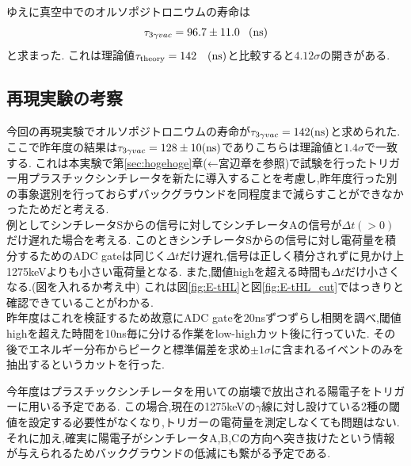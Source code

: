 ゆえに真空中でのオルソポジトロニウムの寿命は
\begin{equation}
	\tau_{3\gamma vac}=96.7 \pm 11.0 \hspace{8pt}(\rm ns)
\end{equation}
と求まった.
これは理論値$\tau_{\rm theory}=142 \hspace{10pt}(\rm ns)$と比較すると$4.12\sigma$の開きがある.

\subsection{再現実験の考察}
今回の再現実験でオルソポジトロニウムの寿命が$\tau_{3\gamma vac}=142(\rm ns)$と求められた.
ここで昨年度の結果は$\tau_{3\gamma vac}=128 \pm 10(\rm ns)$でありこちらは理論値と$1.4\sigma$で一致する.
これは本実験で第\ref{sec:hogehoge}章(←宮辺章を参照)で試験を行ったトリガー用プラスチックシンチレータを新たに導入することを考慮し,昨年度行った別の事象選別を行っておらずバックグラウンドを同程度まで減らすことができなかったためだと考える. \\

例としてシンチレータSからの信号に対してシンチレータAの信号が$\Delta t(>0)$だけ遅れた場合を考える.
このときシンチレータSからの信号に対し電荷量を積分するためのADC gateは同じく$\Delta t$だけ遅れ,信号は正しく積分されずに見かけ上1275keVよりも小さい電荷量となる.
また,閾値highを超える時間も$\Delta t$だけ小さくなる.(図を入れるか考え中)
これは図\ref{fig:E-tHL}と図\ref{fig:E-tHL_cut}ではっきりと確認できていることがわかる.\\
昨年度はこれを検証するため故意にADC gateを20nsずつずらし相関を調べ,閾値highを超えた時間を10ns毎に分ける作業をlow-highカット後に行っていた.
その後でエネルギー分布からピークと標準偏差を求め$\pm 1\sigma$に含まれるイベントのみを抽出するというカットを行った.

今年度はプラスチックシンチレータを用いての崩壊で放出される陽電子をトリガーに用いる予定である.
この場合,現在の1275keVの$\gamma$線に対し設けている2種の閾値を設定する必要性がなくなり,トリガーの電荷量を測定しなくても問題はない.
それに加え,確実に陽電子がシンチレータA,B,Cの方向へ突き抜けたという情報が与えられるためバックグラウンドの低減にも繋がる予定である.
